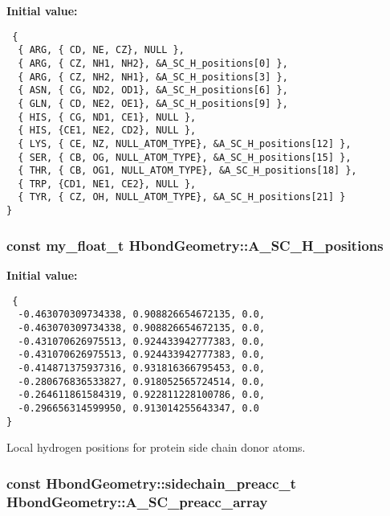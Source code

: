 \textbf{Initial value:}

\begin{Code}\begin{verbatim} {
  { ARG, { CD, NE, CZ}, NULL },
  { ARG, { CZ, NH1, NH2}, &A_SC_H_positions[0] },
  { ARG, { CZ, NH2, NH1}, &A_SC_H_positions[3] },
  { ASN, { CG, ND2, OD1}, &A_SC_H_positions[6] },
  { GLN, { CD, NE2, OE1}, &A_SC_H_positions[9] },
  { HIS, { CG, ND1, CE1}, NULL },
  { HIS, {CE1, NE2, CD2}, NULL },
  { LYS, { CE, NZ, NULL_ATOM_TYPE}, &A_SC_H_positions[12] },
  { SER, { CB, OG, NULL_ATOM_TYPE}, &A_SC_H_positions[15] },
  { THR, { CB, OG1, NULL_ATOM_TYPE}, &A_SC_H_positions[18] },
  { TRP, {CD1, NE1, CE2}, NULL },
  { TYR, { CZ, OH, NULL_ATOM_TYPE}, &A_SC_H_positions[21] }
}
\end{verbatim}\end{Code}
\subsubsection{\setlength{\rightskip}{0pt plus 5cm}const my\_\-float\_\-t \bf{Hbond\-Geometry::A\_\-SC\_\-H\_\-positions}\hspace{0.3cm}{\tt  [static, private]}}\label{classSimSite3D_1_1HbondGeometry_66e9722f03aaf1c9a6567284538d5fa9}


\textbf{Initial value:}

\begin{Code}\begin{verbatim} {
  -0.463070309734338, 0.908826654672135, 0.0,  
  -0.463070309734338, 0.908826654672135, 0.0,  
  -0.431070626975513, 0.924433942777383, 0.0,  
  -0.431070626975513, 0.924433942777383, 0.0,  
  -0.414871375937316, 0.931816366795453, 0.0,  
  -0.280676836533827, 0.918052565724514, 0.0,  
  -0.264611861584319, 0.922811228100786, 0.0,  
  -0.296656314599950, 0.913014255643347, 0.0   
}
\end{verbatim}\end{Code}
Local hydrogen positions for protein side chain donor atoms. 

\subsubsection{\setlength{\rightskip}{0pt plus 5cm}const \bf{Hbond\-Geometry::sidechain\_\-preacc\_\-t} Hbond\-Geometry::A\_\-SC\_\-preacc\_\-array\hspace{0.3cm}{\tt  [static, private]}}\label{classSimSite3D_1_1HbondGeometry_b63bedb579466023399489db46844a28}


